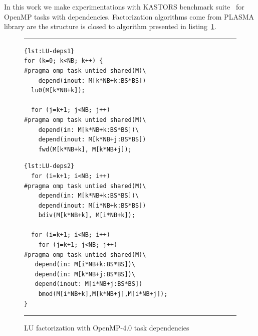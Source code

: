 \documentclass{Styles/llncs}
\begin{document}
In this work we make experimentations with KASTORS benchmark suite~\cite{virouleau:hal-01081974} for OpenMP tasks with dependencies.
Factorization algorithms come from PLASMA library are the structure is closed to algorithm presented in listing~\ref{lulst}.

\begin{figure}[tbp]
\hrule
\begin{minipage}[t]{.43\textwidth}
\begin{lstlisting}[frame=none,style=smaller,showlines=true,label=lst:LU-deps]{lst:LU-deps1}
for (k=0; k<NB; k++) {
#pragma omp task untied shared(M)\
    depend(inout: M[k*NB+k:BS*BS])
  lu0(M[k*NB+k]);

  for (j=k+1; j<NB; j++)
#pragma omp task untied shared(M)\
    depend(in: M[k*NB+k:BS*BS])\
    depend(inout: M[k*NB+j:BS*BS])
    fwd(M[k*NB+k], M[k*NB+j]);
\end{lstlisting}
\end{minipage}\hfill
\begin{minipage}[t]{.485\textwidth}
\begin{lstlisting}[frame=none,style=smaller,label=lst:LU-deps,firstnumber=11]{lst:LU-deps2}
  for (i=k+1; i<NB; i++)
#pragma omp task untied shared(M)\
    depend(in: M[k*NB+k:BS*BS])\
    depend(inout: M[i*NB+k:BS*BS])
    bdiv(M[k*NB+k], M[i*NB+k]);

  for (i=k+1; i<NB; i++)
    for (j=k+1; j<NB; j++)
#pragma omp task untied shared(M)\
   depend(in: M[i*NB+k:BS*BS])\
   depend(in: M[k*NB+j:BS*BS])\
   depend(inout: M[i*NB+j:BS*BS])
    bmod(M[i*NB+k],M[k*NB+j],M[i*NB+j]);
}
\end{lstlisting}
\end{minipage}
\hrule
\caption{LU factorization with OpenMP-4.0 task dependencies} \label{lulst}
\end{figure}
\end{document}
